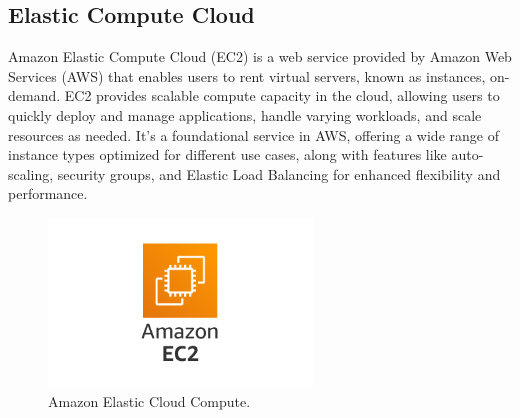 \documentclass{article}
\begin{document}
\subsection{Elastic Compute Cloud}
Amazon Elastic Compute Cloud (EC2) is a web service provided by Amazon Web Services (AWS) that enables users to rent virtual servers, known as instances, on-demand. EC2 provides scalable compute capacity in the cloud, allowing users to quickly deploy and manage applications, handle varying workloads, and scale resources as needed. It's a foundational service in AWS, offering a wide range of instance types optimized for different use cases, along with features like auto-scaling, security groups, and Elastic Load Balancing for enhanced flexibility and performance.\par
\begin{figure}[h]
    \centering
    \includegraphics[width=7cm]{Pictures/Theory/amazon_ec2.png}
    \caption{Amazon Elastic Cloud Compute.}
    \label{fig:enter-label}
\end{figure}
\end{document}
